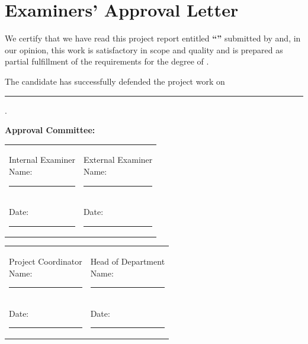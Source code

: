 
\chapter*{Examiners' Approval Letter}

\vspace{1cm}

We certify that we have read this project report entitled \textbf{``\projecttitle''} submitted by \textbf{\studentname} and, in our opinion, this work is satisfactory in scope and quality and is prepared as partial fulfillment of the requirements for the degree of \degreename.

\vspace{0.5cm}

The candidate has successfully defended the project work on \rule{4cm}{0.4pt}.

\vspace{3cm}

\noindent\textbf{Approval Committee:}

\vspace{2cm}

\noindent
\begin{tabular}{@{}p{}p{}@{}}
\signatureline{Internal Examiner \\ Name: \rule{4cm}{0.4pt} \\ Date: \rule{4cm}{0.4pt}} &
\signatureline{External Examiner \\ Name: \rule{4cm}{0.4pt} \\ Date: \rule{4cm}{0.4pt}}
\end{tabular}

\vspace{2cm}

\noindent
\begin{tabular}{@{}p{}p{}@{}}
\signatureline{Project Coordinator \\ Name: \rule{4cm}{0.4pt} \\ Date: \rule{4cm}{0.4pt}} &
\signatureline{Head of Department \\ Name: \rule{4cm}{0.4pt} \\ Date: \rule{4cm}{0.4pt}}
\end{tabular}
